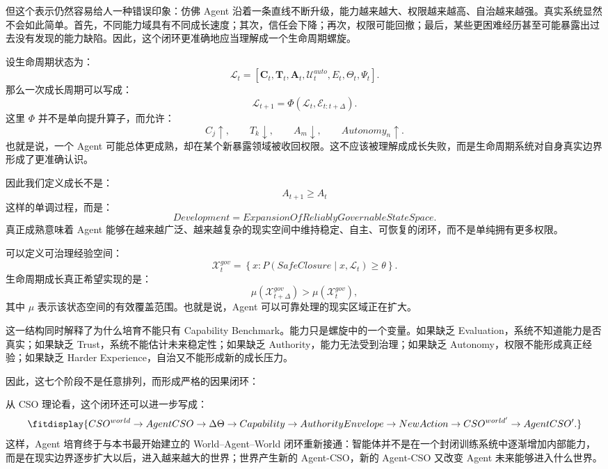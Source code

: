 但这个表示仍然容易给人一种错误印象：仿佛 Agent 沿着一条直线不断升级，能力越来越大、权限越来越高、自治越来越强。真实系统显然不会如此简单。首先，不同能力域具有不同成长速度；其次，信任会下降；再次，权限可能回撤；最后，某些更困难经历甚至可能暴露出过去没有发现的能力缺陷。因此，这个闭环更准确地应当理解成一个生命周期螺旋。

设生命周期状态为：
\[
\mathcal L_t
=
[
\mathbf C_t,
\mathbf T_t,
\mathbf A_t,
\mathcal U^{auto}_t,
E_t,
\Theta_t,
\Psi_t
].
\]
那么一次成长周期可以写成：
\[
\mathcal L_{t+1}
=
\Phi(
\mathcal L_t,
\mathcal E_{t:t+\Delta}
).
\]
这里 $\Phi$ 并不是单向提升算子，而允许：
\[
C_j\uparrow,\qquad
T_k\downarrow,\qquad
A_m\downarrow,\qquad
Autonomy_n\uparrow.
\]
也就是说，一个 Agent 可能总体更成熟，却在某个新暴露领域被收回权限。这不应该被理解成成长失败，而是生命周期系统对自身真实边界形成了更准确认识。

因此我们定义成长不是：
\[
A_{t+1}\geq A_t
\]
这样的单调过程，而是：
\[
\boxed{
Development
=
ExpansionOfReliablyGovernableStateSpace.
}
\]
真正成熟意味着 Agent 能够在越来越广泛、越来越复杂的现实空间中维持稳定、自主、可恢复的闭环，而不是单纯拥有更多权限。

可以定义可治理经验空间：
\[
\mathcal X^{gov}_t
=
\left\{
x:
P(
SafeClosure
\mid
x,\mathcal L_t
)
\geq
\theta
\right\}.
\]
生命周期成长真正希望实现的是：
\[
\mu(
\mathcal X^{gov}_{t+\Delta}
)
>
\mu(
\mathcal X^{gov}_t
),
\]
其中 $\mu$ 表示该状态空间的有效覆盖范围。也就是说，Agent 可以可靠处理的现实区域正在扩大。

这一结构同时解释了为什么培育不能只有 Capability Benchmark。能力只是螺旋中的一个变量。如果缺乏 Evaluation，系统不知道能力是否真实；如果缺乏 Trust，系统不能估计未来稳定性；如果缺乏 Authority，能力无法受到治理；如果缺乏 Autonomy，权限不能形成真正经验；如果缺乏 Harder Experience，自治又不能形成新的成长压力。

因此，这七个阶段不是任意排列，而形成严格的因果闭环：
\begin{statementbox}
\centering
{}
\end{statementbox}

从 CSO 理论看，这个闭环还可以进一步写成：
\[
\fitdisplay{
CSO^{world}
\rightarrow
AgentCSO
\rightarrow
\Delta\Theta
\rightarrow
Capability
\rightarrow
AuthorityEnvelope
\rightarrow
NewAction
\rightarrow
CSO^{world'}
\rightarrow
AgentCSO'.
}
\]
这样，Agent 培育终于与本书最开始建立的 World--Agent--World 闭环重新接通：智能体并不是在一个封闭训练系统中逐渐增加内部能力，而是在现实边界逐步扩大以后，进入越来越大的世界；世界产生新的 Agent-CSO，新的 Agent-CSO 又改变 Agent 未来能够进入什么世界。

